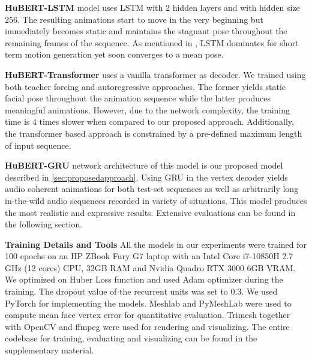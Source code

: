 \documentclass[10pt,twocolumn,letterpaper]{article}
\begin{document}
\noindent\textbf{HuBERT-LSTM} model uses LSTM with 2 hidden layers and with hidden size 256. The resulting animations start to move in the very beginning but immediately becomes static and maintains the stagnant pose throughout the remaining frames of the sequence. As mentioned in \cite{fragkiadaki}, LSTM dominates for short term motion generation yet soon converges to a mean pose. 



\noindent\textbf{HuBERT-Transformer} uses a vanilla transformer as decoder. We trained using both teacher forcing and autoregressive approaches. The former yields static facial pose throughout the animation sequence while the latter produces meaningful animations. However, due to the network complexity, the training time is 4 times slower when compared to our proposed approach. Additionally, the transformer based approach is constrained by a pre-defined maximum length of input sequence.


\noindent\textbf{HuBERT-GRU} network architecture of this model is our proposed model described in \cref{sec:proposedapproach}. Using GRU in the vertex decoder yields audio coherent animations for both test-set sequences as well as arbitrarily long in-the-wild audio sequences recorded in variety of situations. This model produces the most realistic and expressive results. Extensive evaluations can be found in the following section.

\noindent\textbf{Training Details and Tools} All the models in our experiments were trained for 100 epochs on an HP ZBook Fury G7 laptop with an Intel Core i7-10850H 2.7 GHz (12 cores) CPU, 32GB RAM and Nvidia Quadro RTX 3000 6GB VRAM. We optimized on Huber Loss function \cite{huberloss} and used Adam optimizer \cite{adam} during the training. The dropout value of the recurrent units was set to $0.3$. We used PyTorch \cite{PyTorch} for implementing the models. Meshlab \cite{MeshLab} and PyMeshLab \cite{pymeshlab} were used to compute mean face vertex error for quantitative evaluation. Trimesh \cite{TrimeshLib} together with OpenCV \cite{opencv_library} and ffmpeg \cite{ffmpeg} were used for rendering and visualizing. The entire codebase for training, evaluating and visualizing can be found in the supplementary material. 
\end{document}
